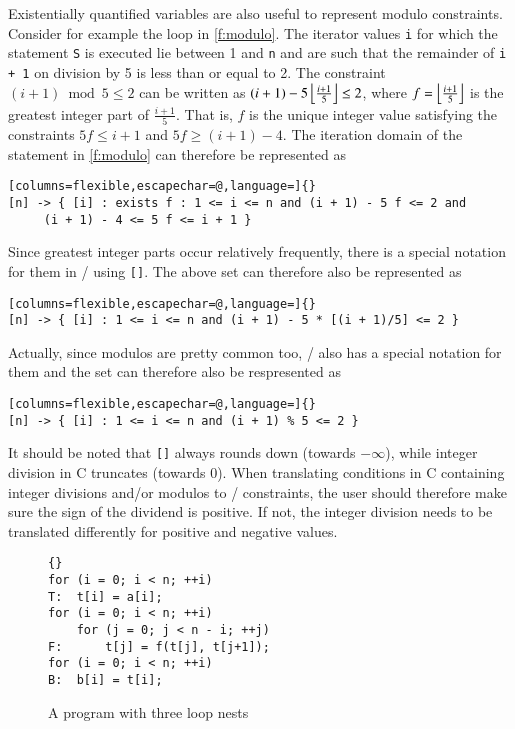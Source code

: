 Existentially quantified variables are also useful to represent
modulo constraints.  Consider for example the loop in
\autoref{f:modulo}.  The iterator values \lstinline!i! for which
the statement \lstinline!S! is executed lie between
1 and \lstinline!n! and are such that the remainder of
\lstinline!i + 1! on division by 5 is less than or equal to 2.
The constraint $(i + 1) \bmod 5 \le 2$ can be written
as $(i + 1) - 5 \left\lfloor\frac{i+1}5\right\rfloor \le 2$, where
$f = \left\lfloor\frac{i+1}5\right\rfloor$ is the greatest integer part of $\frac{i+1}5$.
That is, $f$ is the unique integer value satisfying the constraints
$5 f \le i + 1$ and $5 f \ge (i+1) - 4$.
The iteration domain of the statement in \autoref{f:modulo}
can therefore be represented as
\begin{lstlisting}[columns=flexible,escapechar=@,language=]{}
[n] -> { [i] : exists f : 1 <= i <= n and (i + 1) - 5 f <= 2 and
	 (i + 1) - 4 <= 5 f <= i + 1 }
\end{lstlisting}
Since greatest integer parts occur relatively frequently, there is
a special notation for them in \isl/ using \lstinline![]!.
The above set can therefore also be represented as
\begin{lstlisting}[columns=flexible,escapechar=@,language=]{}
[n] -> { [i] : 1 <= i <= n and (i + 1) - 5 * [(i + 1)/5] <= 2 }
\end{lstlisting}
Actually, since modulos are pretty common too, \isl/ also has
a special notation for them and the set can therefore also be respresented as
\begin{lstlisting}[columns=flexible,escapechar=@,language=]{}
[n] -> { [i] : 1 <= i <= n and (i + 1) % 5 <= 2 }
\end{lstlisting}
It should be noted that \lstinline![]! always rounds down
(towards $-\infty$), while integer division in C truncates
(towards 0).  When translating conditions in C containing integer
divisions and/or modulos to \isl/ constraints, the user should therefore
make sure the sign of the dividend is positive.  If not, the integer
division needs to be translated differently for positive and negative
values.

\begin{figure}
\begin{lstlisting}[escapechar=@]{}
for (i = 0; i < n; ++i)
T:  t[i] = a[i];
for (i = 0; i < n; ++i)
    for (j = 0; j < n - i; ++j)
F:      t[j] = f(t[j], t[j+1]);
for (i = 0; i < n; ++i)
B:  b[i] = t[i];
\end{lstlisting}
\caption{A program with three loop nests}
\label{f:three loops}
\end{figure}

